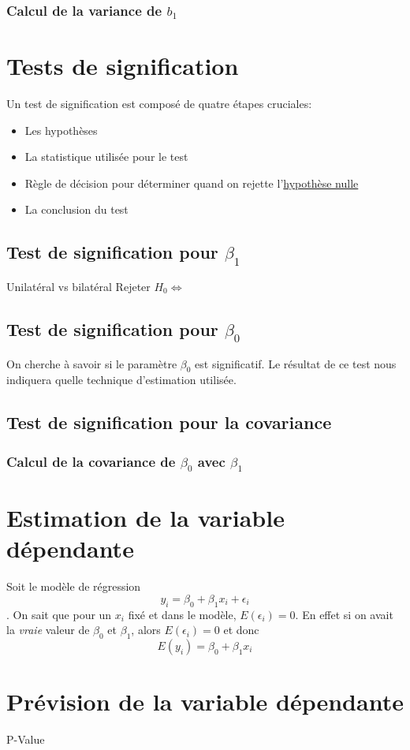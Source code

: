 \documentclass[12pt]{book}
\newcommand\todo[1]{\phantom{#1}}
\theoremstyle{definition}
\begin{document}
\subsection{Calcul de la variance de $b_1$}
\chapter{Tests de signification}
Un test de signification est composé de quatre étapes cruciales:
\begin{itemize}
    \item Les hypothèses
    \item La statistique utilisée pour le test
    \item Règle de décision pour déterminer quand on rejette l'\hyperref[def:hypothese_nulle]{hypothèse nulle}
    \item La conclusion du test
\end{itemize}

\section{Test de signification pour $\beta_1$}
Unilatéral vs bilatéral
Rejeter $H_0 \iff $
\section{Test de signification pour $\beta_0$}
On cherche à savoir si le paramètre $\beta_0$ est significatif. Le résultat de ce test 
nous indiquera quelle technique d'estimation utilisée.
\section{Test de signification pour la covariance}
\subsection{Calcul de la covariance de $\beta_0$ avec $\beta_1$}
\chapter{Estimation de la variable dépendante}
Soit le modèle de régression \todo{Add link} $$y_i = \beta_0 + \beta_1x_i + \epsilon_i$$.
On sait que pour un $x_i$ fixé et dans le modèle, $E(\epsilon_i) = 0$. En effet si on avait 
la \textit{vraie} valeur de $\beta_0$ et $\beta_1$, alors $E(\epsilon_i) = 0$ et donc 
$$E(y_i) = \beta_0 + \beta_1x_i$$
\chapter{Prévision de la variable dépendante}
P-Value
\appendix
\end{document}
